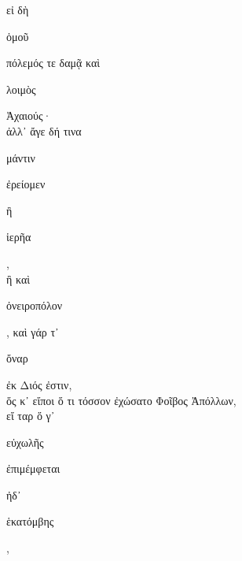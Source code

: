 \documentclass{ransom}
\begin{document}
\begin{foreignpage}
\begin{graytext}
εἰ δὴ \begin{whitetext}ὁμοῦ\end{whitetext} πόλεμός τε δαμᾷ καὶ \begin{whitetext}λοιμὸς\end{whitetext} Ἀχαιούς·\\
ἀλλ᾽ ἄγε δή τινα \begin{whitetext}μάντιν\end{whitetext} \begin{whitetext}ἐρείομεν\end{whitetext} ἢ \begin{whitetext}ἱερῆα\end{whitetext},\\
ἢ καὶ \begin{whitetext}ὀνειροπόλον\end{whitetext}, καὶ γάρ τ᾽ \begin{whitetext}ὄναρ\end{whitetext} ἐκ Διός ἐστιν,\\
ὅς κ᾽ εἴποι ὅ τι τόσσον ἐχώσατο Φοῖβος Ἀπόλλων,\\
εἴ ταρ ὅ γ᾽ \begin{whitetext}εὐχωλῆς\end{whitetext} \begin{whitetext}ἐπιμέμφεται\end{whitetext} ἠδ᾽ \begin{whitetext}ἑκατόμβης\end{whitetext},\hfill{}\\

\end{graytext}


\end{foreignpage}
\end{document}
